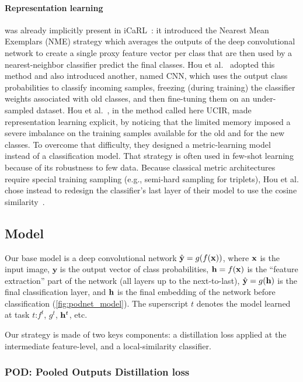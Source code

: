 \paragraph{Representation learning} was already implicitly present in
iCaRL~\citep{rebuffi2017icarl}: it introduced the Nearest Mean Exemplars (NME) strategy which
averages the outputs of the deep convolutional network to create a single proxy feature vector per
class that are then used by a nearest-neighbor classifier predict the final classes. Hou et
al.~\citep{hou2019ucir} adopted this method and also introduced another, named CNN, which uses the
output class probabilities to classify incoming samples, freezing (during training) the classifier
weights associated with old classes, and then fine-tuning them on an under-sampled dataset. Hou et
al.~\citep{hou2019ucir}, in the method called here UCIR, made representation learning explicit, by
noticing that the limited memory imposed a severe imbalance on the training samples available for
the old and for the new classes. To overcome that difficulty, they designed a metric-learning model
instead of a classification model. That strategy is often used in few-shot
learning~\citep{gidaris2018fewshot_wo_forgetting} because of its robustness to few data. Because
classical metric architectures require special training sampling (e.g., semi-hard sampling for
triplets), Hou et al. chose instead to redesign the classifier's last layer of their model to use
the cosine similarity~\citep{luo2018cosine_classifier}.


\subsection{Model}
\label{sec:podnet_model}

Our base model is a deep convolutional network $\hat{\mathbf{y}} = g(f(\mathbf{x}))$, where $\mathbf{x}$ is the input image,
$\mathbf{y}$ is the output vector of class probabilities, $\mathbf{h} = f(\mathbf{x})$ is the ``feature
extraction'' part of the network (all layers up to the next-to-last), $\hat{\mathbf{y}} = g(\mathbf{h})$ is the final
classification layer, and $\mathbf{h}$ is the final embedding of the network before classification
(\autoref{fig:podnet_model}). The superscript $t$ denotes the model learned at task $t$:$f^{t}$, $g^{t}$,
$\mathbf{h}^{t}$, etc.

Our strategy is made of two keys components: a distillation loss applied at the intermediate
feature-level, and a local-similarity classifier.

\subsubsection{POD: Pooled Outputs Distillation loss}
\label{sec:podnet_pod}

